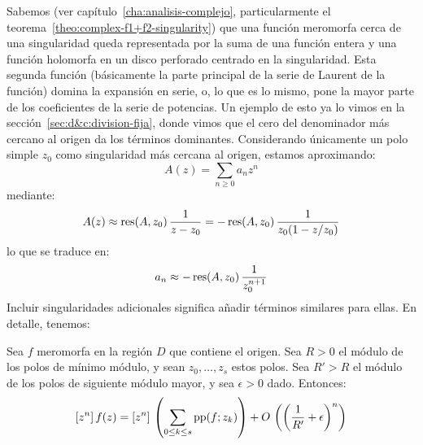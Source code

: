   Sabemos
  (ver capítulo~\ref{cha:analisis-complejo},%
   particularmente el teorema~\ref{theo:complex-f1+f2-singularity})
  que una función meromorfa cerca de una singularidad
  queda representada por la suma de una función entera
  y una función holomorfa
  en un disco perforado centrado en la singularidad.
  Esta segunda función
  (básicamente la parte principal
   de la serie de Laurent de la función)%
  domina la expansión en serie,
  o,
  lo que es lo mismo,
  pone la mayor parte de los coeficientes de la serie de potencias.
  Un ejemplo de esto
  ya lo vimos en la sección~\ref{sec:d&c:division-fija},
  donde vimos que el cero del denominador más cercano al origen
  da los términos dominantes.
  Considerando únicamente un polo simple \(z_0\)
  como singularidad más cercana al origen,
  estamos aproximando:
  \begin{equation*}
    A(z)
      = \sum_{n \ge 0} a_n z^n
  \end{equation*}
  mediante:
  \begin{equation*}
    A(z)
      \approx \operatorname{res}(A, z_0) \, \frac{1}{z - z_0}
      =	      - \operatorname{res}(A, z_0) \, \frac{1}{z_0 (1 - z / z_0)}
  \end{equation*}
  lo que se traduce en:
  \begin{equation}
    \label{eq:ae:dominating-single-pole-approximation}
    a_n
      \approx - \operatorname{res}(A, z_0) \, \frac{1}{z_0^{n + 1}}
  \end{equation}
  Incluir singularidades adicionales
  significa añadir términos similares para ellas.
  En detalle,
  tenemos:
  \begin{theorem}
    \label{theo:poles-approximation}
    Sea \(f\) meromorfa en la región \(D\) que contiene el origen.
    Sea \(R > 0\) el módulo de los polos de mínimo módulo,
    y sean \(z_0, \dotsc, z_s\) estos polos.
    Sea \(R' > R\) el módulo de los polos de siguiente módulo mayor,
    y sea \(\epsilon > 0\) dado.
    Entonces:
    \begin{equation}
      \label{eq:poles-approximation}
      \left[ z^n  \right] f(z)
	= \left[ z^n \right] \,
	    \left( \sum_{0 \le k \le s} \operatorname{pp}(f; z_k) \right)
	    + O \, \left( \left( \frac{1}{R'}
	    + \epsilon \right)^n \right)
    \end{equation}
  \end{theorem}
